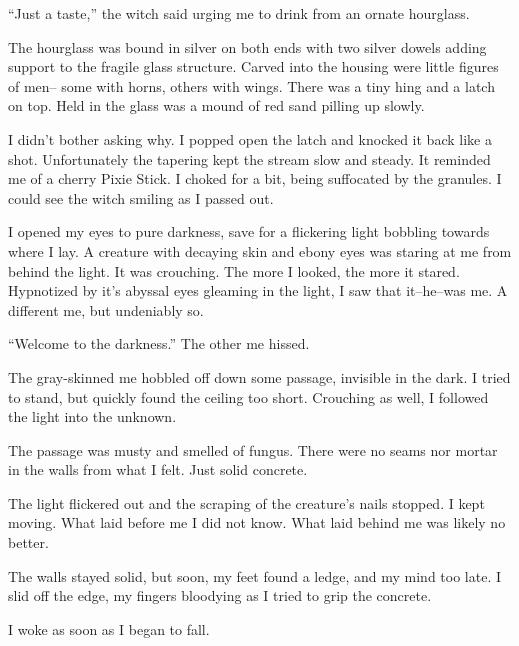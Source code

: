 ``Just a taste,'' the witch said urging me to drink from an ornate hourglass.
\VV


\noindent
The hourglass was bound in silver on both ends with two silver dowels adding support to
the fragile glass structure.  Carved into the housing were little figures of men--
some with horns, others with wings.  There was a tiny hing and a latch on top.
Held in the glass was a mound of red sand pilling up slowly.


I didn't bother asking why.  I popped open the latch and knocked it back like a shot.
Unfortunately the tapering kept the stream slow and steady.
It reminded me of a cherry Pixie Stick.
I choked for a bit, being suffocated by the granules.
I could see the witch smiling as I passed out.


I opened my eyes to pure darkness, save for a flickering light bobbling
towards where I lay.
A creature with decaying skin and ebony eyes was staring at me from behind the light.
It was crouching.  The more I looked, the more it stared.  Hypnotized by it's abyssal
eyes gleaming in the light, I saw that it--he--was me.
A different me, but undeniably so.
\VV


``Welcome to the darkness.''  The other me hissed.
\VV


\noindent
The gray-skinned me hobbled off down some passage, invisible in the dark.
I tried to stand, but quickly found the ceiling too short.  Crouching as well,
I followed the light into the unknown.


The passage was musty and smelled of fungus.  There were no seams nor mortar in
the walls from what I felt.  Just solid concrete.


The light flickered out and the scraping of the creature's nails stopped.
I kept moving.  What laid before me I did not know.
What laid behind me was likely no better.


The walls stayed solid, but soon, my feet found a ledge, and my mind too late.
I slid off the edge, my fingers bloodying as I tried to grip the concrete.

I woke as soon as I began to fall.
%
%
